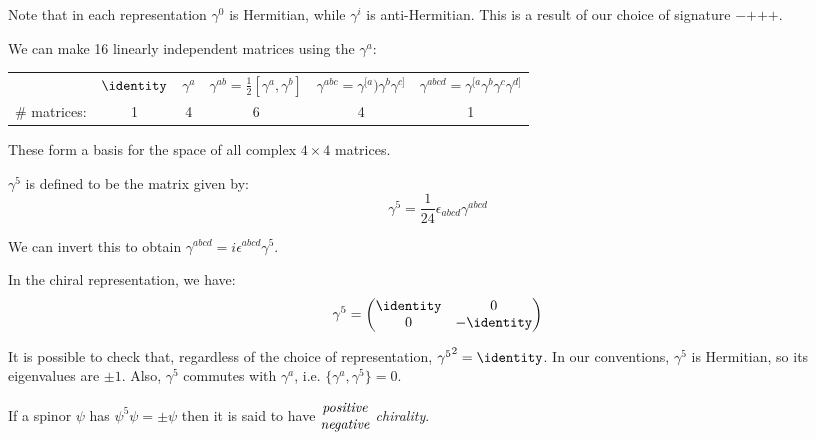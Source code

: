 \documentclass{jknotes} %
\begin{document}
Note that in each representation \(\gamma^0\) is Hermitian, while \(\gamma^i\) is anti-Hermitian. This is a result of our choice of signature \(-\)\(+\)\(+\)\(+\).

We can make 16 linearly independent matrices using the \(\gamma^a\):
\begin{table}[H]
    \centering
    \begin{tabular}{cccccc}
        &\(\identity\) & \(\gamma^a\) & \(\gamma^{ab}=\frac{1}{2}[\gamma^a,\gamma^b]\) & \(\gamma^{abc} = \gamma^{[a})\gamma^b\gamma^{c]}\) & \(\gamma^{abcd} = \gamma^{[a}\gamma^b\gamma^c\gamma^{d]}\)
        \\
        \# matrices: & 1 & 4 & 6 & 4 & 1
    \end{tabular}
\end{table}
These form a basis for the space of all complex \(4\times4\) matrices.

\begin{defn}
    \(\gamma^5\) is defined to be the matrix given by:
    \begin{equation}
        \gamma^5 = \frac{1}{24}\epsilon_{abcd}\gamma^{abcd}
    \end{equation}
\end{defn}
We can invert this to obtain \(\gamma^{abcd} = i\epsilon^{abcd}\gamma^5\).
\begin{eg}
    In the chiral representation, we have:
    \begin{equation}
        \gamma^5 = 
        \begin{pmatrix}
            \identity & 0\\
            0 & -\identity
        \end{pmatrix}
    \end{equation}
\end{eg}

It is possible to check that, regardless of the choice of representation, \({\gamma^5}^2 = \identity\). In our conventions, \(\gamma^5\) is Hermitian, so its eigenvalues are \(\pm1\). Also, \(\gamma^5\) commutes with \(\gamma^a\), i.e. \(\{\gamma^a,\gamma^5\} = 0\).

\begin{defn}
    If a spinor \(\psi\) has \(\psi^5\psi = \pm \psi\) then it is said to have
    \(\begin{matrix}
        \text{\emph{positive}} \\
        \text{\emph{negative}}
    \end{matrix}\)
    \emph{chirality}.
\end{defn}
\end{document}
